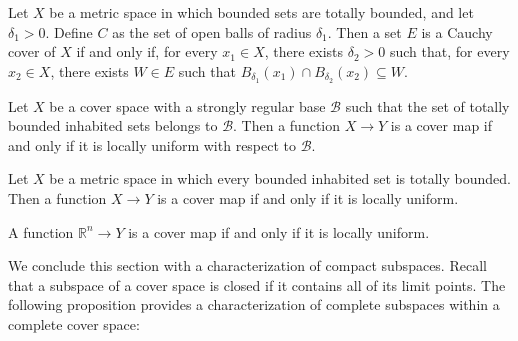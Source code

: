 \documentclass[reqno]{amsart}
\theoremstyle{definition}
\theoremstyle{remark}
\numberwithin{figure}{section}
\begin{document}
\begin{example}
Let $X$ be a metric space in which bounded sets are totally bounded, and let $\delta_1 > 0$.
Define $C$ as the set of open balls of radius $\delta_1$.
Then a set $E$ is a Cauchy cover of $X$ if and only if, for every $x_1 \in X$, there exists $\delta_2 > 0$ such that, for every $x_2 \in X$,
there exists $W \in E$ such that $B_{\delta_1}(x_1) \cap B_{\delta_2}(x_2) \subseteq W$.
\end{example}

\begin{cor}
Let $X$ be a cover space with a strongly regular base $\mathcal{B}$ such that the set of totally bounded inhabited sets belongs to $\mathcal{B}$.
Then a function $X \to Y$ is a cover map if and only if it is locally uniform with respect to $\mathcal{B}$.
\end{cor}

\begin{cor}
Let $X$ be a metric space in which every bounded inhabited set is totally bounded.
Then a function $X \to Y$ is a cover map if and only if it is locally uniform.
\end{cor}

\begin{cor}
A function $\mathbb{R}^n \to Y$ is a cover map if and only if it is locally uniform.
\end{cor}

We conclude this section with a characterization of compact subspaces.
Recall that a subspace of a cover space is closed if it contains all of its limit points.
The following proposition provides a characterization of complete subspaces within a complete cover space:
\end{document}
